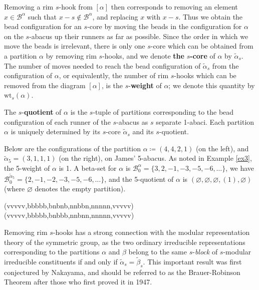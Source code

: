 \documentclass[ALCO, Unicode,published]{cedram}
\begin{document}
Removing a rim $s$-hook from $[\alpha]$ then corresponds to removing an element $x\in\mathcal{B}^\alpha$ such that $x-s\not\in\mathcal{B}^\alpha$, and replacing $x$ with $x-s$. Thus we obtain the bead configuration for an $s$-core by moving the beads in the configuration for $\alpha$ on the $s$-abacus up their runners as far as possible. Since the order in which we move the beads is irrelevant, there is only one $s$-core which can be obtained from a partition $\alpha$ by removing rim $s$-hooks, and we denote \textbf{the} $s$\textbf{-core} of $\alpha$ by $\tilde{\alpha}_s$. The number of moves needed to reach the bead configuration of $\tilde{\alpha}_s$ from the configuration of $\alpha$, or equivalently, the number of rim $s$-hooks which can be removed from the diagram $[\alpha]$, is the $s$-\textbf{weight} of $\alpha$; we denote this quantity by $\text{wt}_s(\alpha)$. 

The $s$-\textbf{quotient} of $\alpha$ is the $s$-tuple of partitions corresponding to the bead configuration of each runner of the $s$-abacus as $s$ separate 1-abaci. Each partition $\alpha$ is uniquely determined by its $s$-core $\tilde{\alpha}_s$ and its $s$-quotient. 

\begin{exam}\label{ex4}
Below are the configurations of the partition $\alpha\coloneqq (4,4,2,1)$ (on the left), and $\tilde{\alpha}_5=(3,1,1,1)$ (on the right), on James' 5-abacus. As noted in Example \ref{ex3}, the 5-weight of $\alpha$ is 1. A beta-set for $\alpha$ is $\mathcal{B}^{\alpha}_0=\{3,2,-1,-3,-5,-6,\dots\}$, we have $\mathcal{B}^{\tilde{\alpha}_5}_0=\{2,-1,-2,-3,-5,-6,\dots\}$, and the 5-quotient of $\alpha$ is $(\varnothing,\varnothing,\varnothing,(1),\varnothing)$ (where $\varnothing$ denotes the empty partition). 
\begin{center}
\abacus(vvvvv,bbbbb,bnbnb,nnbbn,nnnnn,vvvvv)
\hspace{15mm}
\abacus(vvvvv,bbbbb,bnbbb,nnbnn,nnnnn,vvvvv)
\end{center}
\end{exam}

Removing rim $s$-hooks has a strong connection with the modular representation theory of the symmetric group, as the two ordinary irreducible representations corresponding to the partitions $\alpha$ and $\beta$ belong to the same $s$-\textit{block} of $s$-modular irreducible constituents if and only if $\tilde{\alpha}_s=\tilde{\beta}_s$. This important result was first conjectured by Nakayama, and should be referred to as the Brauer-Robinson Theorem after those who first proved it in 1947.
\end{document}
